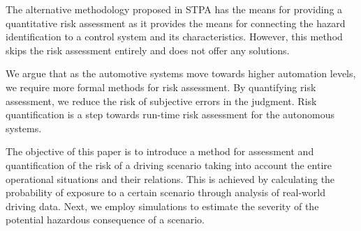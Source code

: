 The alternative methodology proposed in STPA has the means for providing a quantitative risk assessment as it provides the means for connecting the hazard identification to a control system and its characteristics. However, this method skips the risk assessment entirely and does not offer any solutions. 

We argue that as the automotive systems move towards higher automation levels, we require more formal methods for risk assessment. By quantifying risk assessment, we reduce the risk of subjective errors in the judgment. Risk quantification is a step towards run-time risk assessment for the autonomous systems.  

The objective of this paper is to introduce a method for assessment and quantification of the risk of a driving scenario taking into account the entire operational situations and their relations. This is achieved by calculating the probability of exposure to a certain scenario through analysis of real-world driving data. Next, we employ simulations to estimate the severity of the potential hazardous consequence of a scenario.



